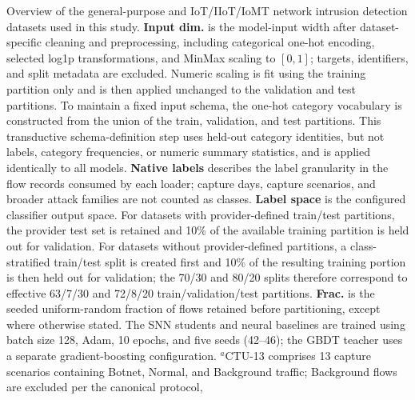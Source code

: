 \begin{table}[!ht]
\centering
\renewcommand{\arraystretch}{1.1}
\setlength{\tabcolsep}{4pt}
\caption{Overview of the general-purpose and IoT/IIoT/IoMT network intrusion
detection datasets used in this study. \textbf{Input dim.} is the model-input
width after dataset-specific cleaning and preprocessing, including categorical
one-hot encoding, selected log1p transformations, and MinMax scaling to
$[0,1]$; targets, identifiers, and split metadata are excluded. Numeric
scaling is fit using the training partition only and is then applied unchanged
to the validation and test partitions. To maintain a fixed input schema, the
one-hot category vocabulary is constructed from the union of the train,
validation, and test partitions. This transductive schema-definition step uses
held-out category identities, but not labels, category frequencies, or numeric
summary statistics, and is applied identically to all models. \textbf{Native labels} describes the label granularity in the
flow records consumed by each loader; capture days, capture scenarios, and
broader attack families are not counted as classes. \textbf{Label space} is
the configured classifier output space. For datasets with provider-defined
train/test partitions, the provider test set is retained and 10\% of the
available training partition is held out for validation. For datasets without
provider-defined partitions, a class-stratified train/test split is created
first and 10\% of the resulting training portion is then held out for
validation; the 70/30 and 80/20 splits therefore correspond to effective
63/7/30 and 72/8/20 train/validation/test partitions. \textbf{Frac.} is the
seeded uniform-random fraction of flows retained before partitioning, except
where otherwise stated. The SNN students and neural
baselines are trained using batch size 128, Adam, 10 epochs, and five seeds
(42--46); the GBDT teacher uses a separate gradient-boosting configuration.
$^{a}$CTU-13 comprises 13 capture scenarios containing Botnet, Normal, and
Background traffic; Background flows are excluded per the canonical protocol,
}
\end{table}
